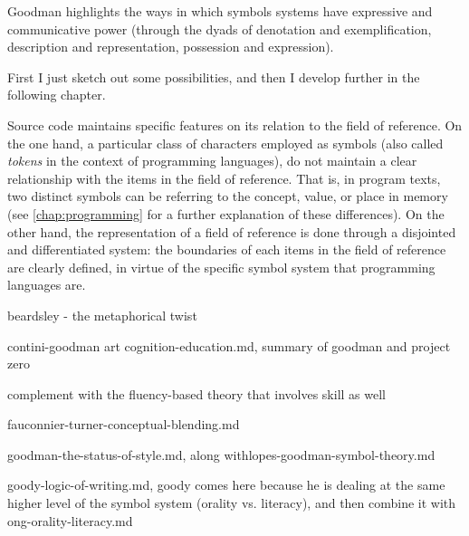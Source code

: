 

Goodman highlights the ways in which symbols systems have expressive and communicative power (through the dyads of denotation and exemplification, description and representation, possession and expression).



First I just sketch out some possibilities, and then I develop further in the following chapter. 

Source code maintains specific features on its relation to the field of reference. On the one hand, a particular class of characters employed as symbols (also called \emph{tokens} in the context of programming languages), do not maintain a clear relationship with the items in the field of reference. That is, in program texts, two distinct symbols can be referring to the concept, value, or place in memory (see \ref{chap:programming} for a further explanation of these differences). %
On the other hand, the representation of a field of reference is done through a disjointed and differentiated system: the boundaries of each items in the field of reference are clearly defined, in virtue of the specific symbol system that programming languages are.


beardsley - the metaphorical twist

contini-goodman art cognition-education.md, summary of goodman and project zero


complement with the fluency-based theory that involves skill as well

fauconnier-turner-conceptual-blending.md

goodman-the-status-of-style.md, along withlopes-goodman-symbol-theory.md

goody-logic-of-writing.md, goody comes here because he is dealing at the same higher level of the symbol system (orality vs. literacy), and then combine it with ong-orality-literacy.md

